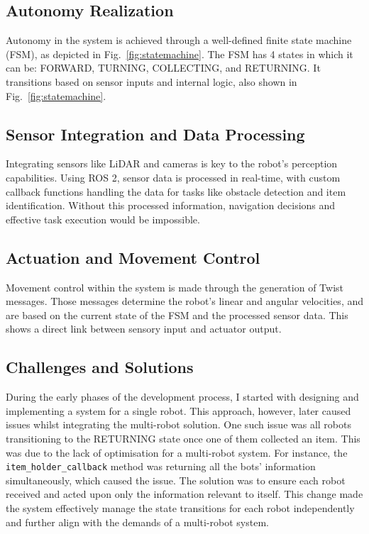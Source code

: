 \documentclass[conference]{IEEEtran}
\begin{document}
\subsection{Autonomy Realization}
Autonomy in the system is achieved through a well-defined finite state machine (FSM), as depicted in Fig.~\ref{fig:statemachine}. The FSM has 4 states in which it can be: FORWARD, TURNING, COLLECTING, and RETURNING. It transitions based on sensor inputs and internal logic, also shown in Fig.~\ref{fig:statemachine}.

\subsection{Sensor Integration and Data Processing}
Integrating sensors like LiDAR and cameras is key to the robot's perception capabilities. Using ROS 2, sensor data is processed in real-time, with custom callback functions handling the data for tasks like obstacle detection and item identification. Without this processed information, navigation decisions and effective task execution would be impossible.

\subsection{Actuation and Movement Control}
Movement control within the system is made through the generation of Twist messages. Those messages determine the robot's linear and angular velocities, and are based on the current state of the FSM and the processed sensor data. This shows a direct link between sensory input and actuator output.

\subsection{Challenges and Solutions}
During the early phases of the development process, I started with designing and implementing a system for a single robot. This approach, however, later caused issues whilst integrating the multi-robot solution. One such issue was all robots transitioning to the RETURNING state once one of them collected an item. This was due to the lack of optimisation for a multi-robot system. For instance, the \texttt{item\_holder\_callback} method was returning all the bots' information simultaneously, which caused the issue. The solution was to ensure each robot received and acted upon only the information relevant to itself. This change made the system effectively manage the state transitions for each robot independently and further align with the demands of a multi-robot system.
\end{document}
